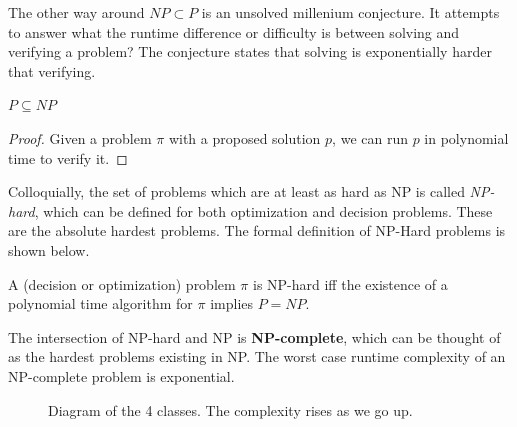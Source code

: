   The other way around $NP \subset P$ is an unsolved millenium conjecture. It attempts to answer what the runtime difference or difficulty is between solving and verifying a problem? The conjecture states that solving is exponentially harder that verifying. 

  \begin{theorem}[$P \subseteq NP$]
    \label{thm:psubseteqnp}
    $P \subseteq NP$
  \end{theorem}
  \begin{proof}
    Given a problem $\pi$ with a proposed solution $p$, we can run $p$ in polynomial time to verify it. 
  \end{proof}

  Colloquially, the set of problems which are at least as hard as NP is called \textit{NP-hard}, which can be defined for both optimization and decision problems. These are the absolute hardest problems. The formal definition of NP-Hard problems is shown below. 

  \begin{definition}[NP-Hard]
    \label{def:np-hard}
    A (decision or optimization) problem $\pi$ is NP-hard iff the existence of a polynomial time algorithm for $\pi$ implies $P = NP$. 
  \end{definition}

  \begin{definition}[NP-Complete]
    \label{def:np-complete}
    The intersection of NP-hard and NP is \textbf{NP-complete}, which can be thought of as the hardest problems existing in NP. The worst case runtime complexity of an NP-complete problem is exponential. 
  \end{definition}

  \begin{figure}[H]
    \centering 
    \caption{Diagram of the 4 classes. The complexity rises as we go up. } 
    \label{fig:class}
  \end{figure}
  
